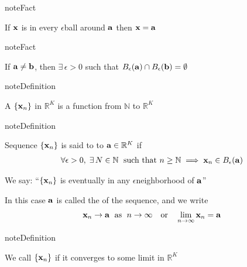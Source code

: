 \documentclass[letterpaper,10pt,english]{jupyterBook}
\begin{document}
\begin{figure}[htbp]
\centering

\noindent{}
\end{figure}

\begin{sphinxadmonition}{note}{Fact}

\sphinxAtStartPar
If \({\bf x}\) is in every \(\epsilon\)\sphinxhyphen{}ball around \({\bf a}\) then
\({\bf x}={\bf a}\)
\end{sphinxadmonition}

\begin{sphinxadmonition}{note}{Fact}

\sphinxAtStartPar
If \({\bf a} \ne {\bf b}\), then \(\exists \, \epsilon > 0\) such that
\(B_\epsilon({\bf a}) \cap B_\epsilon({\bf b}) = \emptyset\)
\end{sphinxadmonition}

\begin{sphinxadmonition}{note}{Definition}

\sphinxAtStartPar
A  \(\{{\bf x}_n\}\) in \(\mathbb{R}^K\) is a function from \(\mathbb{N}\) to \(\mathbb{R}^K\)
\end{sphinxadmonition}

\begin{sphinxadmonition}{note}{Definition}

\sphinxAtStartPar
Sequence \(\{{\bf x}_n\}\) is said to  to \({\bf a} \in \mathbb{R}^K\) if
\begin{equation*}
\begin{split}
\forall \epsilon > 0, 
\;
\exists \, N \in \mathbb{N}
\; 
\text{ such that }  n \geq \mathbb{N} \implies {\bf x}_n \in B_{\epsilon}({\bf a})
\end{split}
\end{equation*}\end{sphinxadmonition}

\sphinxAtStartPar
We say: “\(\{{\bf x}_n\}\) is eventually in any \(\epsilon\)\sphinxhyphen{}neighborhood of \({\bf a}\)”

\sphinxAtStartPar
In this case \({\bf a}\) is called the  of the sequence, and we write
\begin{equation*}
\begin{split} 
{\bf x}_n \to {\bf a} \; \text{ as } \; n \to \infty
\quad \text{or} \quad
\lim_{n \to \infty} {\bf x}_n = {\bf a}
\end{split}
\end{equation*}
\begin{sphinxadmonition}{note}{Definition}

\sphinxAtStartPar
We call \(\{ {\bf x}_n \}\)  if it converges to some limit in \(\mathbb{R}^K\)
\end{sphinxadmonition}
\end{document}
